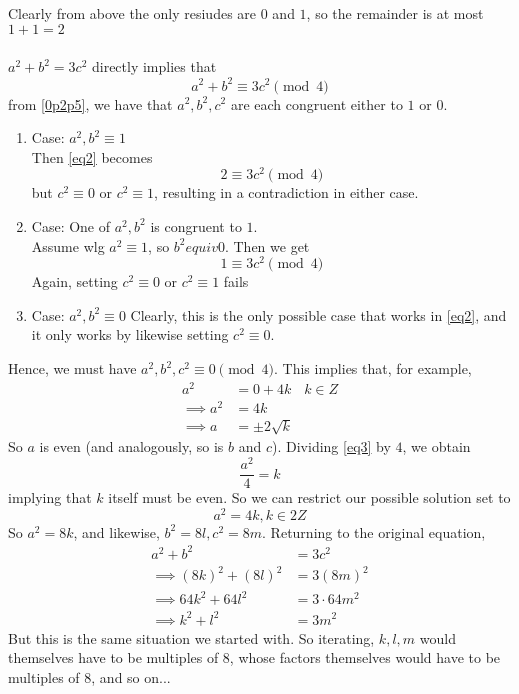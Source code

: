 \documentclass{article}
\begin{document}
\subsubsection{}\label{0p2p6}
Clearly from above the only resiudes are $0$ and $1$, so the remainder is at most $1+1=2$
\subsubsection{}
$a^2 + b^2 = 3c^2$ directly implies that
\begin{equation}
a^2 + b^2 \equiv 3c^2 \pmod{4} \label{eq2}
\end{equation}
from \ref{0p2p5}, we have that $a^2, b^2, c^2$ are each congruent either to $1$ or $0$. 
\begin{enumerate}
\item Case: $a^2,b^2 \equiv 1$\\
Then \eqref{eq2} becomes
\begin{equation*}
2 \equiv 3c^2 \pmod{4}
\end{equation*}
but $c^2 \equiv 0$ or $c^2 \equiv 1$, resulting in a contradiction in either case. 
\item Case: One of $a^2,b^2$ is congruent to $1$.\\
Assume wlg $a^2 \equiv 1$, so $b^2 equiv 0$. Then we get
\begin{equation*}
1 \equiv 3c^2 \pmod{4}
\end{equation*}
Again, setting $c^2 \equiv 0$ or $c^2 \equiv 1$ fails
\item Case: $a^2,b^2 \equiv 0$
Clearly, this is the only possible case that works in \eqref{eq2}, and it only works by likewise setting $c^2 \equiv 0$. 
\end{enumerate}
Hence, we must have $a^2,b^2,c^2 \equiv 0 \pmod{4}$. This implies that, for example,
\begin{align}
a^2 &= 0 + 4k & \text{$k \in Z$}\\
\implies a^2 &= 4k\\ \label{eq3}
\implies a &= \pm2\sqrt{k}
\end{align}
So $a$ is even (and analogously, so is $b$ and $c$). Dividing \eqref{eq3} by $4$, we obtain 
\begin{equation*}
\frac{a^2}{4} = k
\end{equation*}
implying that $k$ itself must be even. So we can restrict our possible solution set to
\begin{equation*}
a^2 = 4k, k \in 2Z
\end{equation*}
So $a^2 = 8k$, and likewise, $b^2 = 8l, c^2 = 8m$. Returning to the original equation,
\begin{align*}
a^2 + b^2 &= 3c^2\\
\implies (8k)^2 + (8l)^2 &= 3(8m)^2\\
\implies 64k^2 + 64l^2 &= 3\cdot 64m^2\\
\implies k^2 + l^2 &= 3m^2
\end{align*}
But this is the same situation we started with. So iterating, $k,l,m$ would themselves have to be multiples of $8$, whose factors themselves would have to be multiples of $8$, and so on...
\end{document}
